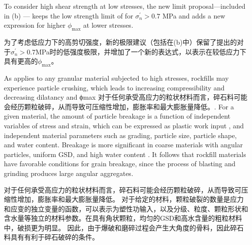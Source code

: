 \begin{ParaColumn}

    \switchcolumn*

    To consider high shear strength at low stresses, the new limit proposal—included in (b) — keeps the low strength limit of \citet{Indraratna1994539} for $\sigma_n^\prime>0.7$ MPa and adds a new expression for higher $\phi_{\max}$ at lower stresses.

    \switchcolumn

    为了考虑低应力下的高剪切强度，新的极限建议（包括在(b)中）保留了\citet{Indraratna1994539}提出的对于$\sigma_n^\prime>0.7$MPa时的低强度极限，并增加了一个新的表达式，以表示在较低应力下具有更高的$\phi_{\max}$。


    As applies to any granular material subjected to high stresses, rockfills may experience particle crushing, which leads to increasing compressibility and decreasing dilatancy and ϕmax 对于任何承受高应力的粒状材料而言，碎石料可能会经历颗粒破碎，从而导致可压缩性增加，膨胀率和最大膨胀量降低\citep{Vesic1968661,Biarez19941,Lade1996309,Biarez1997607,Ovalle2015587,Dano201895}。. For a given material, the amount of particle breakage is a function of independent variables of stress and strain, which can be expressed as plastic work input \citep{Daouadji2001113,Yin2017,Ovalle2020487}, and independent material parameters such as grading, particle size, particle shape, and water content. Breakage is more significant in coarse materials with angular particles, uniform GSD, and high water content \citep{Hardin19851177,Ovalle2013123,Ovalle2018161}. It follows that rockfill materials have favorable conditions for grain breakage, since the process of blasting and grinding produces large angular aggregates.

    \switchcolumn

    对于任何承受高应力的粒状材料而言，碎石料可能会经历颗粒破碎，从而导致可压缩性增加，膨胀率和最大膨胀量降低\citep{Vesic1968661,Biarez19941,Lade1996309,Biarez1997607,Ovalle2015587,Dano201895}。 对于给定的材料，颗粒破裂的数量是应力和应变的独立变量的函数，可以表示为塑性功输入\citep{Daouadji2001113,Yin2017,Ovalle2020487}，以及分级、粒度、颗粒形状和含水量等独立的材料参数。在具有角状颗粒，均匀的GSD和高水含量的粗粒材料中，破损更为明显\citep{Hardin19851177,Ovalle2013123,Ovalle2018161}。 因此，由于爆破和磨碎过程会产生大角度的骨料，因此碎石料具有有利于碎石破碎的条件。
    

\end{ParaColumn}
